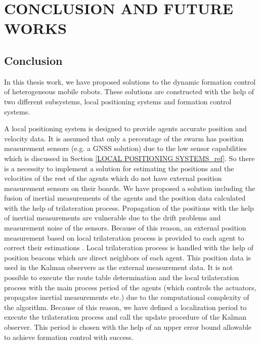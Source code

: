 

\chapter{CONCLUSION AND FUTURE WORKS}
\label{chp:conclusion}








	
\section{Conclusion}
In this thesis work, we have proposed solutions to the dynamic formation control of heterogeneous mobile robots. These solutions are constructed with the help of two different subsystems, local positioning systems and formation control systems. 

A	local positioning system is designed to provide agents accurate position and velocity data. It is assumed that only a percentage of the swarm has position measurement sensors (e.g. a GNSS solution) due to the low sensor capabilities which is discussed in Section \ref{LOCAL POSITIONING SYSTEMS_ref}. So there is a necessity to implement a solution for estimating the positions and the velocities of the rest of the agents which do not have external position measurement sensors on their boards.  We have proposed a solution including the fusion of inertial measurements of the agents and the position data calculated with the help of trilateration process. Propagation of the positions with the help of inertial measurements are vulnerable due to the drift problems and measurement noise of the sensors. Because of this reason, an external position measurement based on local trilateration process is provided to each agent to correct their estimations . Local trilateration process is handled with the help of position beacons which are direct neighbors of each agent. This position data is used in the Kalman observers as the external measurement data. It is not possible to execute the route table determination and the local trilateration process with the main process period of the agents (which controls the actuators, propagates inertial measurements etc.) due to the computational complexity of the algorithm. Because of this reason, we have defined a localization period to execute the trilateration process and call the update procedure of the Kalman observer. This period is chosen with the help of an upper error bound allowable to achieve formation control with success.
       
